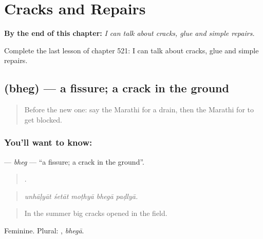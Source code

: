 
\chapter{Cracks and Repairs}
\label{ch:mr-cracks-and-repairs}

\begin{chapteropening}
\textbf{By the end of this chapter:} \emph{I can talk about cracks, glue and simple repairs.}

Complete the last lesson of chapter 521: I can talk about cracks, glue and simple repairs.
\end{chapteropening}

\section[\texorpdfstring{\mr{भेग} (bheg)}{भेग (bheg)}]{ (bheg) — a fissure; a crack in the ground}

\label{lesson:MR-C521-bheg}



\begin{quote}
Before the new one: say the Marathi for a drain, then the Marathi for to get blocked.
\end{quote}

\subsection*{You'll want to know: }
\textbf{} — \emph{bheg} — \textquotedblleft{}a fissure; a crack in the ground\textquotedblright{}.

\begin{quote}
    .
\end{quote}

\begin{quote}
\emph{unhāḷyāt śetāt moṭhyā bhegā paḍlyā.}
\end{quote}

\begin{quote}
In the summer big cracks opened in the field.
\end{quote}

Feminine. Plural: , \emph{bhegā}.

